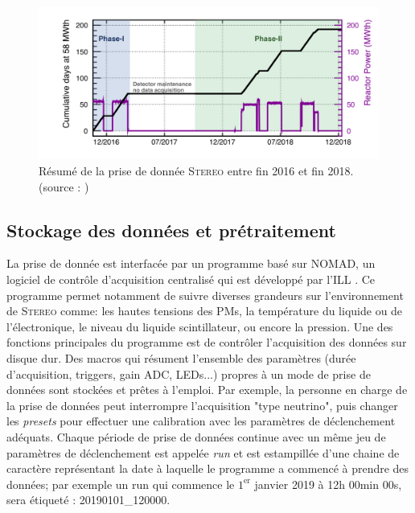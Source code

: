 {\begin{figure}[h!] 
\centering 
\includegraphics[width=0.8\linewidth]{images/DataTaking_phase12.png} 
\caption[Résumé de la prise de donnée \textsc{Stereo} entre fin 2016 et fin 2018]{Résumé de la prise de donnée \textsc{Stereo} entre fin 2016 et fin 2018. (source : \cite{docdb886})} 
\label{fig:DataTaking_phase12} 
\end{figure} 

\clearpage 

} 

\bigbreak 

% 

\subsection{Stockage des données et prétraitement} 

La prise de donnée est interfacée par un programme basé sur NOMAD, un logiciel de contrôle d'acquisition centralisé qui est développé par l'ILL \cite{docdb83}. Ce programme permet notamment de suivre diverses grandeurs sur l'environnement de \textsc{Stereo} comme: les hautes tensions des PMs, la température du liquide ou de l'électronique, le niveau du liquide scintillateur, ou encore la pression. Une des fonctions principales du programme est de contrôler l'acquisition des données sur disque dur. Des macros qui résument l'ensemble des paramètres (durée d'acquisition, triggers, gain ADC, LEDs...) propres à un mode de prise de données sont stockées et prêtes à l'emploi. Par exemple, la personne en charge de la prise de données peut interrompre l'acquisition "type neutrino", puis changer les \textit{presets} pour effectuer une calibration avec les paramètres de déclenchement adéquats. Chaque période de prise de données continue avec un même jeu de paramètres de déclenchement est appelée \og \textit{run} \fg{} et est estampillée d'une chaine de caractère représentant la date à laquelle le programme a commencé à prendre des données; par exemple un run qui commence le $1^\textrm{er}$ janvier 2019 à 12h 00min 00s, sera étiqueté : 20190101\_120000.\\ 

